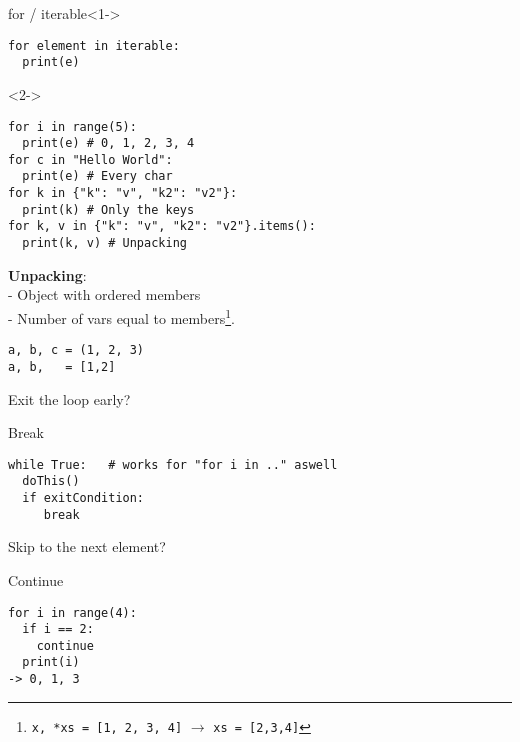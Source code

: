 \documentclass{beamer}
\begin{document}
\begin{frame}[fragile]
    \begin{block}{for / iterable}<1->
        \begin{verbatim}
for element in iterable:
  print(e)
        \end{verbatim}
    \end{block}
\begin{example}<2->
        \begin{verbatim}
for i in range(5):
  print(e) # 0, 1, 2, 3, 4
for c in "Hello World":
  print(e) # Every char
for k in {"k": "v", "k2": "v2"}:
  print(k) # Only the keys
for k, v in {"k": "v", "k2": "v2"}.items():
  print(k, v) # Unpacking
\end{verbatim}
\end{example}
\end{frame}

\begin{frame}[fragile]
\textbf{Unpacking}:\\
- Object with ordered members\\
- Number of vars equal to members\footnote{\texttt{x, *xs  = [1, 2, 3, 4]}  $\rightarrow$ \texttt{xs = [2,3,4]}}.
\begin{example}
    \begin{verbatim}
a, b, c = (1, 2, 3)
a, b,   = [1,2]
    \end{verbatim}
\end{example}
\end{frame}

\begin{frame}[fragile]
    Exit the loop early?
    \begin{block}{Break}
    \begin{verbatim}
while True:   # works for "for i in .." aswell
  doThis()
  if exitCondition:
     break
    \end{verbatim}
    \end{block}
    Skip to the next element?
    \begin{block}{Continue}
        \begin{verbatim}
for i in range(4):
  if i == 2:
    continue
  print(i)
-> 0, 1, 3
        \end{verbatim}
    \end{block}
\end{frame}
\end{document}
